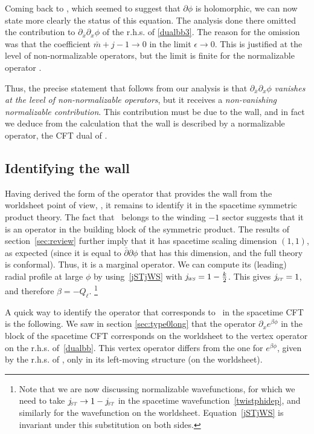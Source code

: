\documentclass[12pt]{article}
\def\ST{{\sst\it\! ST}}
\def\WS{{\sst\it\! WS}}
\numberwithin{equation}{section}
\def\sst{\scriptscriptstyle}
\begin{document}
Coming back to \ddbarphiWS, which seemed to suggest that $\partial\phi$ is holomorphic, we can now state more clearly the status of this equation. The analysis done there omitted the contribution to $\partial_{\bar x}\partial_x\phi$ of the r.h.s. of \eqref{dualbb3}. The reason for the omission was that the coefficient $\bar m+j-1\to 0$ in the limit $\epsilon\to 0$. This is justified at the level of non-normalizable operators, but the limit is finite for the normalizable operator \holoviol. 

Thus, the precise statement that follows from our analysis is that $\partial_{\bar x}\partial_x\phi$ {\it vanishes at the level of non-normalizable operators}, but it receives a {\it non-vanishing normalizable contribution}. This contribution must be due to the wall, and in fact we deduce from the calculation that the wall is described by a normalizable operator, the CFT dual of \holoviol. 

\subsection{Identifying the wall}
\label{sec:whatsthewall}

Having derived the form of the operator that provides the wall from the worldsheet point of view, \holoviol, it remains to identify it in the spacetime symmetric product theory. The fact that \holoviol\ belongs to the winding $-1$ sector suggests that it is an operator in the building block of the symmetric product. The results of section~\ref{sec:review} further imply that it has spacetime scaling dimension $(1,1)$, as expected (since it is equal to $\bar\partial\partial\phi$ that has this dimension, and the full theory is conformal). Thus, it is a marginal operator. We can compute its (leading) radial profile at large $\phi$ by using~\eqref{jSTjWS} with $j_\WS=1-\frac k2$. This gives $j_\ST=1$, and therefore $\beta=-Q_\ell$.%
\footnote{Note that we are now discussing normalizable wavefunctions, for which we need to take $j_\ST\to1-j_\ST$ in the spacetime wavefunction~\eqref{twistphidep}, and similarly for the wavefunction on the worldsheet.  Equation~\eqref{jSTjWS} is invariant under this substitution on both sides.}

A quick way to identify the operator that corresponds to \holoviol\ in the spacetime CFT is the following. We saw in section \ref{sec:type0long} that the operator $\partial_x e^{\beta\phi}$ in the block of the spacetime CFT corresponds on the worldsheet to the vertex operator on the r.h.s. of~\eqref{dualbb}. This vertex operator differs from the one for $e^{\beta\phi}$, given by the r.h.s. of \ebphiws, only in its left-moving structure (on the worldsheet).
\end{document}
